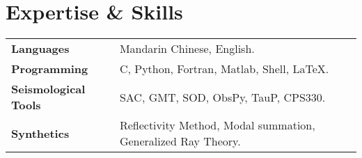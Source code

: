 \section*{Expertise \& Skills}

\begin{tabular}{p{} p{}}
\textbf{Languages} & Mandarin Chinese, English. \\
\textbf{Programming} & C, Python, Fortran, Matlab, Shell, LaTeX. \\
\textbf{Seismological Tools} & SAC, GMT, SOD, ObsPy, TauP, CPS330. \\
\textbf{Synthetics} & Reflectivity Method, Modal summation, Generalized Ray Theory.\\
\end{tabular}

